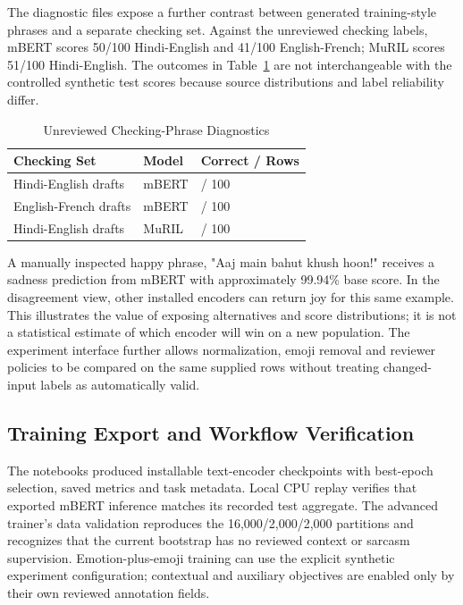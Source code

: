 \documentclass[journal]{IEEEtran}
\begin{document}
The diagnostic files expose a further contrast between generated training-style phrases and a separate checking set. Against the unreviewed checking labels, mBERT scores 50/100 Hindi-English and 41/100 English-French; MuRIL scores 51/100 Hindi-English. The outcomes in Table~\ref{tab:checking_diagnostics} are not interchangeable with the controlled synthetic test scores because source distributions and label reliability differ.

\begin{table}[!t]
\caption{Unreviewed Checking-Phrase Diagnostics}\label{tab:checking_diagnostics}
\centering
\footnotesize
\begin{tabularx}{\columnwidth}{@{}>{\raggedright\arraybackslash}X>{\raggedright\arraybackslash}X>{\raggedleft\arraybackslash}X@{}}
\toprule
\textbf{Checking Set} & \textbf{Model} & \textbf{Correct / Rows} \\
\midrule
Hindi-English drafts & mBERT & 50 / 100 \\
English-French drafts & mBERT & 41 / 100 \\
Hindi-English drafts & MuRIL & 51 / 100 \\
\bottomrule
\end{tabularx}
\end{table}


A manually inspected happy phrase, "Aaj main bahut khush hoon!" receives a sadness prediction from mBERT with approximately 99.94\% base score. In the disagreement view, other installed encoders can return joy for this same example. This illustrates the value of exposing alternatives and score distributions; it is not a statistical estimate of which encoder will win on a new population. The experiment interface further allows normalization, emoji removal and reviewer policies to be compared on the same supplied rows without treating changed-input labels as automatically valid.

\subsection{Training Export and Workflow Verification}

The notebooks produced installable text-encoder checkpoints with best-epoch selection, saved metrics and task metadata. Local CPU replay verifies that exported mBERT inference matches its recorded test aggregate. The advanced trainer's data validation reproduces the 16,000/2,000/2,000 partitions and recognizes that the current bootstrap has no reviewed context or sarcasm supervision. Emotion-plus-emoji training can use the explicit synthetic experiment configuration; contextual and auxiliary objectives are enabled only by their own reviewed annotation fields.
\end{document}
